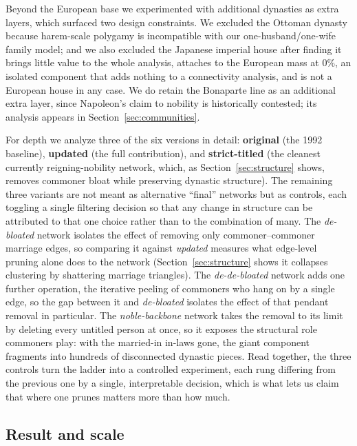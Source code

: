 Beyond the European base we experimented with additional dynasties as
extra layers, which surfaced two design constraints. We
excluded the Ottoman dynasty because harem-scale polygamy is incompatible
with our one-husband/one-wife family model; and we also excluded the Japanese
imperial house after finding it brings little value to the whole analysis, attaches to the European mass at $0\%$, an
isolated component that adds nothing to a connectivity analysis, and is not a European house in any case. We do retain the
Bonaparte line as an additional extra layer, since Napoleon's claim to nobility
is historically contested; its analysis appears in Section~\ref{sec:communities}.

For depth we analyze three of the six versions in detail: \textbf{original} (the
1992 baseline), \textbf{updated} (the full contribution), and
\textbf{strict-titled} (the cleanest currently reigning-nobility network, which, as
Section~\ref{sec:structure} shows, removes commoner bloat while preserving dynastic
structure). The remaining three variants are not meant as alternative ``final'' networks but
as controls, each toggling a single filtering decision so that any change in
structure can be attributed to that one choice rather than to the combination of many.
The \emph{de-bloated} network isolates the effect of removing only
commoner--commoner marriage edges, so comparing it against \emph{updated} measures
what edge-level pruning alone does to the network (Section~\ref{sec:structure}
shows it collapses clustering by shattering marriage triangles). The
\emph{de-de-bloated} network adds one further operation, the iterative peeling of
commoners who hang on by a single edge, so the gap between it and \emph{de-bloated}
isolates the effect of that pendant removal in particular. The
\emph{noble-backbone} network takes the removal to its limit by deleting every
untitled person at once, so it exposes the structural role commoners play: with
the married-in in-laws gone, the giant component fragments into hundreds of
disconnected dynastic pieces. Read together, the three controls turn the ladder
into a controlled experiment, each rung differing from the previous one by a
single, interpretable decision, which is what lets us claim that where one
prunes matters more than how much.


\subsection{Result and scale}
\label{sub:result}

